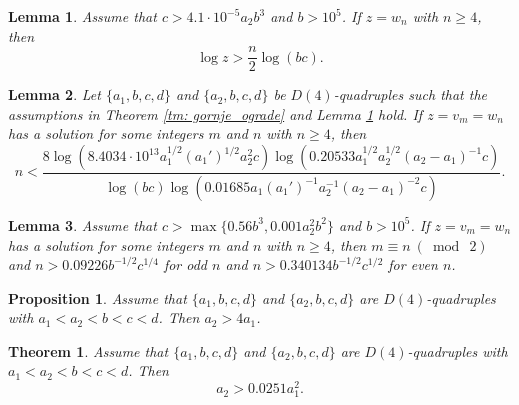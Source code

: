 \documentclass[10pt,a4paper]{amsart}
\newtheorem{theorem}{Theorem}
\newtheorem{lemma}{Lemma}
\newtheorem{proposition}{Proposition}
\begin{document}
\begin{lemma}\label{gornje_ograde3}
     Assume that $c >4.1\cdot10^{-5}a_2b^3$ and $b>10^5$. If $z=w_n$ with $n \geq 4$, then 
    \[ \log z > \frac{n}{2}\log(bc) .\]
\end{lemma}  

\begin{lemma}\label{lemma: gornja_n_1}
    Let $\{a_1,b,c,d\}$ and $\{a_2,b,c,d\}$ be $D(4)$-quadruples such that the assumptions in Theorem \ref{tm: gornje_ograde} and Lemma \ref{gornje_ograde3} hold. If $z=v_m=w_n$ has a solution for some integers $m$ and $n$ with $n \geq 4$, then 
   $$ n < \frac{8\log(8.4034 \cdot 10^{13} a_1^{1/2}(a_1')^{1/2}a_2^2c)\log(0.20533a_1^{1/2}a_2^{1/2}(a_2-a_1)^{-1}c)}{\log(bc)\log(0.01685a_1(a_1')^{-1}a_2^{-1}(a_2-a_1)^{-2}c)}. $$
\end{lemma}

\begin{lemma}\label{lema: donja na n u terminima b i c}
    Assume that $c>\max\{0.56b^3,0.001a_2^2b^2\}$ and $b>10^5$. If $z=v_m=w_n$ has a solution for some integers $m$ and $n$ with $n\geq 4$, then $m\equiv n\ (\bmod \ 2)$ and $n>0.09226b^{-1/2}c^{1/4}$ for odd $n$ and $n>0.340134b^{-1/2}c^{1/2}$ for even $n$.
\end{lemma}

\begin{proposition} 
\label{prop: prop1}
    Assume that $\{a_1,b,c,d\}$ and $\{a_2,b,c,d\}$ are $D(4)$-quadruples with $a_1<a_2<b<c<d$. Then $a_2>4a_1$.
\end{proposition}

\begin{theorem}
    Assume that $\{a_1,b,c,d\}$ and $\{a_2,b,c,d\}$ are $D(4)$-quadruples with $a_1<a_2<b<c<d$. Then 
       $$a_2>0.0251a_1^2.$$
   
\end{theorem}
\end{document}
